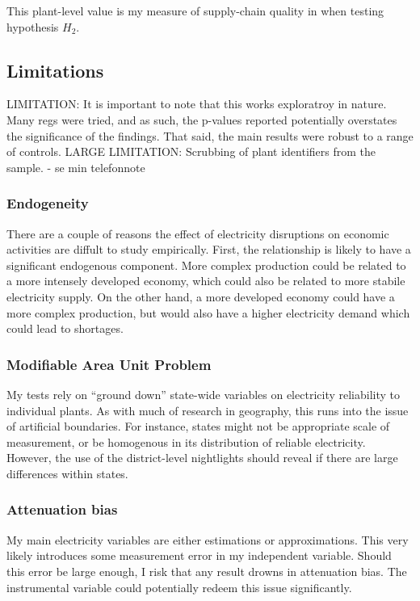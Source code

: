 \documentclass[11pt]{article}
\begin{document}
This plant-level value is my measure of supply-chain quality in when testing hypothesis \(H_2\).

\subsection{Limitations}
\label{sec:org979560b}

LIMITATION: It is important to note that this works exploratroy in nature. Many regs were tried, and as such, the p-values reported potentially overstates the significance of the findings. That said, the main results were robust to a range of controls.
LARGE LIMITATION: Scrubbing of plant identifiers from the sample. - se min telefonnote

\subsubsection{Endogeneity}
\label{sec:orgd4457e7}
There are a couple of reasons the effect of electricity disruptions on economic activities are diffult to study empirically. First, the relationship is likely to have a significant endogenous component. More complex production could be related to a more intensely developed economy, which could also be related to more stabile electricity supply. On the other hand, a more developed economy could have a more complex production, but would also have a higher electricity demand which could lead to shortages.

\subsubsection{Modifiable Area Unit Problem}
\label{sec:org4e3cc26}
My tests rely on ``ground down'' state-wide variables on electricity reliability to individual plants. As with much of research in geography, this runs into the issue of artificial boundaries. For instance, states might not be appropriate scale of measurement, or be homogenous in its distribution of reliable electricity. However, the use of the district-level nightlights should reveal if there are large differences within states.

\subsubsection{Attenuation bias}
\label{sec:orge917ac0}
My main electricity variables are either estimations or approximations. This very likely introduces some measurement error in my independent variable. Should this error be large enough, I risk that any result drowns in attenuation bias. The instrumental variable could potentially redeem this issue significantly.
\end{document}
